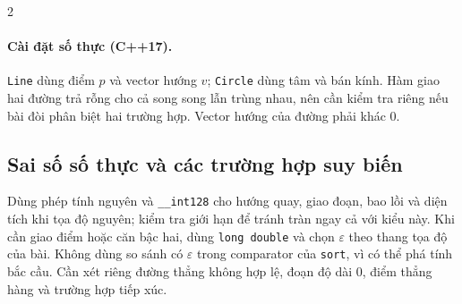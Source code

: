 \begin{multicols}{2}
\paragraph{Cài đặt số thực (C++17).}
\texttt{Line} dùng điểm $p$ và vector hướng $v$; \texttt{Circle} dùng
tâm và bán kính. Hàm giao hai đường trả rỗng cho cả song song lẫn
trùng nhau, nên cần kiểm tra riêng nếu bài đòi phân biệt hai trường
hợp. Vector hướng của đường phải khác $0$.

\subsection{Sai số số thực và các trường hợp suy biến}
Dùng phép tính nguyên và \texttt{\_\_int128} cho hướng quay, giao
đoạn, bao lồi và diện tích khi tọa độ nguyên; kiểm tra giới hạn
để tránh tràn ngay cả với kiểu này. Khi cần giao điểm hoặc căn bậc
hai, dùng \texttt{long double} và chọn $\varepsilon$ theo thang tọa độ
của bài. Không dùng so sánh có $\varepsilon$ trong comparator của
\texttt{sort}, vì có thể phá tính bắc cầu. Cần xét riêng đường thẳng
không hợp lệ, đoạn độ dài $0$, điểm thẳng hàng và trường hợp tiếp xúc.

\end{multicols}
\endgroup